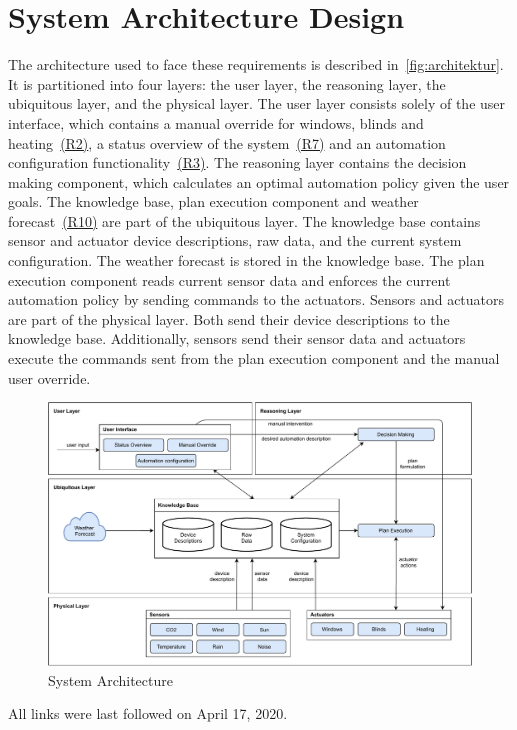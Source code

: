 \documentclass[runningheads]{llncs}
\begin{document}
\newpage
\section{System Architecture Design}
The architecture used to face these requirements is described in~\autoref{fig:architektur}.
It is partitioned into four layers: the user layer, the reasoning layer, the ubiquitous layer, and the physical layer.
The user layer consists solely of the user interface, which contains a manual override for windows, blinds and heating~\hyperref[r2]{(R2)}, a status overview of the system~\hyperref[r7]{(R7)} and an automation configuration functionality~\hyperref[r3]{(R3)}.
The reasoning layer contains the decision making component, which calculates an optimal automation policy given the user goals.
The knowledge base, plan execution component and weather forecast~\hyperref[r10]{(R10)} are part of the ubiquitous layer.
The knowledge base contains sensor and actuator device descriptions, raw data, and the current system configuration. The weather forecast is stored in the knowledge base. The plan execution component reads current sensor data and enforces the current automation policy by sending commands to the actuators.
Sensors and actuators are part of the physical layer. Both send their device descriptions to the knowledge base. Additionally, sensors send their sensor data and actuators execute the commands sent from the plan execution component and the manual user override.

\begin{figure}
    \centering              
    \includegraphics[width=\textwidth]{archiv1.pdf}
    \caption[System Architecture]{System Architecture}
    \label{fig:architektur}         
\end{figure}


%
%



All links were last followed on April 17, 2020.
\end{document}
